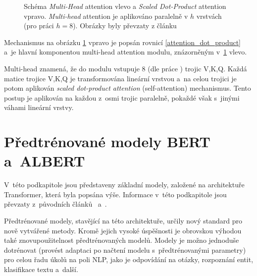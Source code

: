 \begin{figure}[hbt]
    \centering
	\caption{Schéma \emph{Multi-Head} attention vlevo a \emph{Scaled Dot-Product} attention vpravo. \emph{Multi-head} attention je aplikováno paralelně v $h$ vrstvách (pro práci \cite{Transformers} $h=8$). Obrázky byly převzaty z článku \cite{Transformers}}
	\label{multihead}
\end{figure}

Mechanismus na obrázku \ref{multihead} vpravo je popsán rovnicí \ref{attention_dot_product} a~je hlavní komponentou multi-head attention modulu, znázorněným v~\ref{multihead} vlevo.\par
Multi-head znamená, že do modulu vstupuje 8 (dle práce \cite{Transformers}) trojic V,K,Q. Každá matice trojice V,K,Q je transformována lineární vrstvou a~na celou trojici je potom aplikován \emph{scaled dot-product attention} (self-attention) mechanismus. Tento postup je aplikován na každou z~osmi trojic paralelně, pokaždé však s~jinými váhami lineární vrstvy.

\section{Předtrénované modely BERT a~ALBERT}
\label{bert_albert}

V~této podkapitole jsou představeny základní modely, založené na architektuře Transformer, která byla popsána výše. Informace v~této podkapitole  jsou převzaty z~původních článků~\cite{BERT} a~\cite{ALBERT}.\par
Předtrénované modely, stavějící na této architektuře, určily nový standard pro nově vytvářené metody. Kromě jejich vysoké úspěšnosti je obrovskou výhodou také znovupoužitelnost předtrénovaných modelů. Modely je možno jednoduše dotrénovat (provést adaptaci po načtení modelu s~předtrénovanými parametry) pro celou řadu úkolů na poli NLP, jako je odpovídání na otázky, rozpoznání entit, klasifikace textu a~další.

